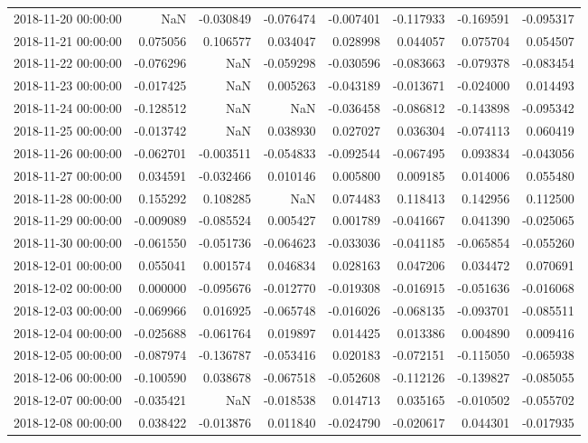 \begin{tabular}{lrrrrrrr}
2018-11-20 00:00:00 & NaN & -0.030849 & -0.076474 & -0.007401 & -0.117933 & -0.169591 & -0.095317 \\
2018-11-21 00:00:00 & 0.075056 & 0.106577 & 0.034047 & 0.028998 & 0.044057 & 0.075704 & 0.054507 \\
2018-11-22 00:00:00 & -0.076296 & NaN & -0.059298 & -0.030596 & -0.083663 & -0.079378 & -0.083454 \\
2018-11-23 00:00:00 & -0.017425 & NaN & 0.005263 & -0.043189 & -0.013671 & -0.024000 & 0.014493 \\
2018-11-24 00:00:00 & -0.128512 & NaN & NaN & -0.036458 & -0.086812 & -0.143898 & -0.095342 \\
2018-11-25 00:00:00 & -0.013742 & NaN & 0.038930 & 0.027027 & 0.036304 & -0.074113 & 0.060419 \\
2018-11-26 00:00:00 & -0.062701 & -0.003511 & -0.054833 & -0.092544 & -0.067495 & 0.093834 & -0.043056 \\
2018-11-27 00:00:00 & 0.034591 & -0.032466 & 0.010146 & 0.005800 & 0.009185 & 0.014006 & 0.055480 \\
2018-11-28 00:00:00 & 0.155292 & 0.108285 & NaN & 0.074483 & 0.118413 & 0.142956 & 0.112500 \\
2018-11-29 00:00:00 & -0.009089 & -0.085524 & 0.005427 & 0.001789 & -0.041667 & 0.041390 & -0.025065 \\
2018-11-30 00:00:00 & -0.061550 & -0.051736 & -0.064623 & -0.033036 & -0.041185 & -0.065854 & -0.055260 \\
2018-12-01 00:00:00 & 0.055041 & 0.001574 & 0.046834 & 0.028163 & 0.047206 & 0.034472 & 0.070691 \\
2018-12-02 00:00:00 & 0.000000 & -0.095676 & -0.012770 & -0.019308 & -0.016915 & -0.051636 & -0.016068 \\
2018-12-03 00:00:00 & -0.069966 & 0.016925 & -0.065748 & -0.016026 & -0.068135 & -0.093701 & -0.085511 \\
2018-12-04 00:00:00 & -0.025688 & -0.061764 & 0.019897 & 0.014425 & 0.013386 & 0.004890 & 0.009416 \\
2018-12-05 00:00:00 & -0.087974 & -0.136787 & -0.053416 & 0.020183 & -0.072151 & -0.115050 & -0.065938 \\
2018-12-06 00:00:00 & -0.100590 & 0.038678 & -0.067518 & -0.052608 & -0.112126 & -0.139827 & -0.085055 \\
2018-12-07 00:00:00 & -0.035421 & NaN & -0.018538 & 0.014713 & 0.035165 & -0.010502 & -0.055702 \\
2018-12-08 00:00:00 & 0.038422 & -0.013876 & 0.011840 & -0.024790 & -0.020617 & 0.044301 & -0.017935 \\

\end{tabular}
